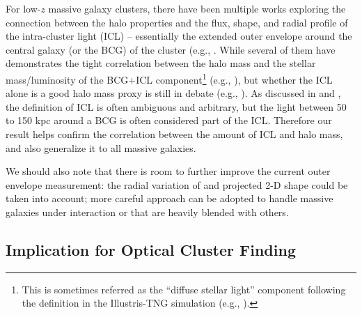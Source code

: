 \documentclass[fleqn,usenatbib,useAMS,english]{mnras}
\begin{document}
    For low-$z$ massive galaxy clusters, there have been multiple works exploring the connection
    between the halo properties and the flux, shape, and radial profile of the intra-cluster
    light (ICL) -- essentially the extended outer envelope around the central galaxy (or the BCG)
    of the cluster (e.g., \citealt{Montes2018, Montes2019, Zhang2019b, Furnell2021, Kluge2021,
    SampaioSantos2021}.
    While several of them have demonstrates the tight correlation between the halo mass and 
    the stellar mass/luminosity of the BCG$+$ICL component\footnote{This is sometimes referred
    as the ``diffuse stellar light'' component following the definition in the Illustris-TNG
    simulation (e.g., \citealt{Zhang2019b, SampaioSantos2021}).} 
    (e.g., \citet{Zhang2019b, Kluge2021, SampaioSantos2021}), but whether the ICL alone is a 
    good halo mass proxy is still in debate (e.g., \citealt{Furnell2021}).
    As discussed in \citet{Huang2018b} and \citet{Kluge2020}, the definition of ICL is often 
    ambiguous and arbitrary, but the light between 50 to 150 kpc around a BCG is often considered 
    part of the ICL.
    Therefore our result helps confirm the correlation between the amount of ICL and halo mass,
    and also generalize it to all massive galaxies.

    We should also note that there is room to further improve the current outer envelope 
    \mstar{} measurement: the radial variation of \mlratio{} and projected 2-D shape could be 
    taken into account; more careful approach can be adopted to handle massive galaxies under 
    interaction or that are heavily blended with others.
    
\subsection{Implication for Optical Cluster Finding}
    \label{sec:perfect_finder}
    
\end{document}
